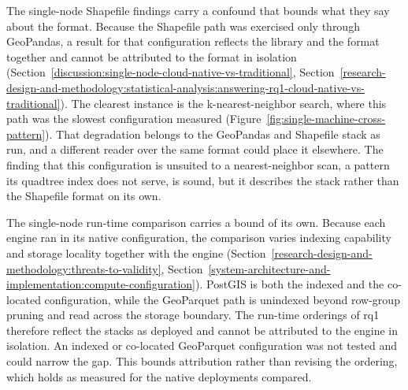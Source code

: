 The single-node Shapefile findings carry a confound that bounds what they say about the format. Because the Shapefile path was exercised only through GeoPandas, a result for that configuration reflects the library and the format together and cannot be attributed to the format in isolation (Section~\ref{discussion:single-node-cloud-native-vs-traditional}, Section~\ref{research-design-and-methodology:statistical-analysis:answering-rq1-cloud-native-vs-traditional}). The clearest instance is the k-nearest-neighbor search, where this path was the slowest configuration measured (Figure~\ref{fig:single-machine-cross-pattern}). That degradation belongs to the GeoPandas and Shapefile stack as run, and a different reader over the same format could place it elsewhere. The finding that this configuration is unsuited to a nearest-neighbor scan, a pattern its quadtree index does not serve, is sound, but it describes the stack rather than the Shapefile format on its own.

The single-node run-time comparison carries a bound of its own. Because each engine ran in its native configuration, the comparison varies indexing capability and storage locality together with the engine (Section~\ref{research-design-and-methodology:threats-to-validity}, Section~\ref{system-architecture-and-implementation:compute-configuration}). PostGIS is both the indexed and the co-located configuration, while the GeoParquet path is unindexed beyond row-group pruning and read across the storage boundary. The run-time orderings of \acrshort{rq}1 therefore reflect the stacks as deployed and cannot be attributed to the engine in isolation. An indexed or co-located GeoParquet configuration was not tested and could narrow the gap. This bounds attribution rather than revising the ordering, which holds as measured for the native deployments compared.


